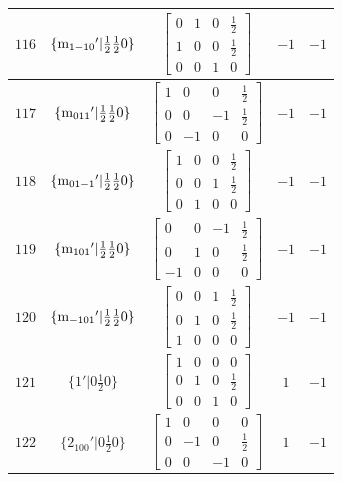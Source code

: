 \documentclass[fleqn,8pt]{jsarticle}
\begin{document}
\begin{longtable}{ccccc}
$ 116 $ & $ \{{\rm m}_{1-10}{}'|\frac{1}{2} \frac{1}{2} 0\} $ & $ \begin{bmatrix} 0 & 1 & 0 & \frac{1}{2} \\ 1 & 0 & 0 & \frac{1}{2} \\ 0 & 0 & 1 & 0 \end{bmatrix} $ & $ -1 $ & $ -1 $ \\ \hline
$ 117 $ & $ \{{\rm m}_{011}{}'|\frac{1}{2} \frac{1}{2} 0\} $ & $ \begin{bmatrix} 1 & 0 & 0 & \frac{1}{2} \\ 0 & 0 & -1 & \frac{1}{2} \\ 0 & -1 & 0 & 0 \end{bmatrix} $ & $ -1 $ & $ -1 $ \\ \hline
$ 118 $ & $ \{{\rm m}_{01-1}{}'|\frac{1}{2} \frac{1}{2} 0\} $ & $ \begin{bmatrix} 1 & 0 & 0 & \frac{1}{2} \\ 0 & 0 & 1 & \frac{1}{2} \\ 0 & 1 & 0 & 0 \end{bmatrix} $ & $ -1 $ & $ -1 $ \\ \hline
$ 119 $ & $ \{{\rm m}_{101}{}'|\frac{1}{2} \frac{1}{2} 0\} $ & $ \begin{bmatrix} 0 & 0 & -1 & \frac{1}{2} \\ 0 & 1 & 0 & \frac{1}{2} \\ -1 & 0 & 0 & 0 \end{bmatrix} $ & $ -1 $ & $ -1 $ \\ \hline
$ 120 $ & $ \{{\rm m}_{-101}{}'|\frac{1}{2} \frac{1}{2} 0\} $ & $ \begin{bmatrix} 0 & 0 & 1 & \frac{1}{2} \\ 0 & 1 & 0 & \frac{1}{2} \\ 1 & 0 & 0 & 0 \end{bmatrix} $ & $ -1 $ & $ -1 $ \\ \hline
$ 121 $ & $ \{1{}'|0 \frac{1}{2} 0\} $ & $ \begin{bmatrix} 1 & 0 & 0 & 0 \\ 0 & 1 & 0 & \frac{1}{2} \\ 0 & 0 & 1 & 0 \end{bmatrix} $ & $ 1 $ & $ -1 $ \\ \hline
$ 122 $ & $ \{2{}_{100}{}'|0 \frac{1}{2} 0\} $ & $ \begin{bmatrix} 1 & 0 & 0 & 0 \\ 0 & -1 & 0 & \frac{1}{2} \\ 0 & 0 & -1 & 0 \end{bmatrix} $ & $ 1 $ & $ -1 $ \\ \hline

\end{longtable}
\end{document}
